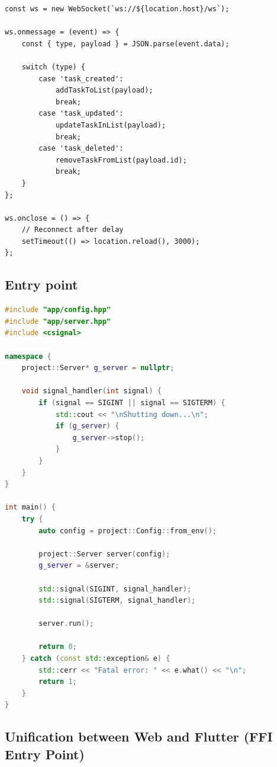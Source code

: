 \begin{lstlisting}[basicstyle=\small\ttfamily, caption={WebSocket client (JavaScript)}]
const ws = new WebSocket(`ws://${location.host}/ws`);

ws.onmessage = (event) => {
    const { type, payload } = JSON.parse(event.data);
    
    switch (type) {
        case 'task_created':
            addTaskToList(payload);
            break;
        case 'task_updated':
            updateTaskInList(payload);
            break;
        case 'task_deleted':
            removeTaskFromList(payload.id);
            break;
    }
};

ws.onclose = () => {
    // Reconnect after delay
    setTimeout(() => location.reload(), 3000);
};
\end{lstlisting}

\subsection{Entry point}

\begin{lstlisting}[language=C++, basicstyle=\small\ttfamily, caption={main.cpp}]
#include "app/config.hpp"
#include "app/server.hpp"
#include <csignal>

namespace {
    project::Server* g_server = nullptr;
    
    void signal_handler(int signal) {
        if (signal == SIGINT || signal == SIGTERM) {
            std::cout << "\nShutting down...\n";
            if (g_server) {
                g_server->stop();
            }
        }
    }
}

int main() {
    try {
        auto config = project::Config::from_env();
        
        project::Server server(config);
        g_server = &server;
        
        std::signal(SIGINT, signal_handler);
        std::signal(SIGTERM, signal_handler);
        
        server.run();
        
        return 0;
    } catch (const std::exception& e) {
        std::cerr << "Fatal error: " << e.what() << "\n";
        return 1;
    }
}
\end{lstlisting}

\subsection{Unification between Web and Flutter (FFI Entry Point)}

